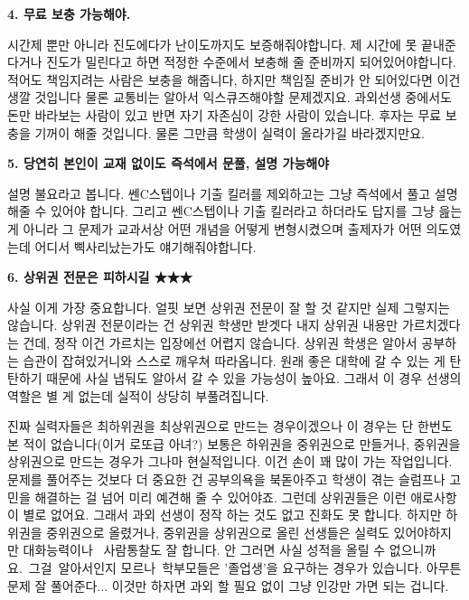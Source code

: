 \item \textbf{4. 무료 보충 가능해야.}
\vspace{5mm}

시간제 뿐만 아니라 진도에다가 난이도까지도 보증해줘야합니다.
제 시간에 못 끝내준다거나 진도가 밀린다고 하면 적정한 수준에서 보충해 줄 준비까지 되어있어야합니다.
적어도 책임지려는 사람은 보충을 해줍니다, 하지만 책임질 준비가 안 되어있다면 이건 생깔 것입니다
물론 교통비는 알아서 익스큐즈해야할 문제겠지요.
과외선생 중에서도 돈만 바라보는 사람이 있고 반면 자기 자존심이 강한 사람이 있습니다.
후자는 무료 보충을 기꺼이 해줄 것입니다. 물론 그만큼 학생이 실력이 올라가길 바라겠지만요.
\vspace{5mm}

\item \textbf{5. 당연히 본인이 교재 없이도 즉석에서 문풀, 설명 가능해야}
\vspace{5mm}

설명 불요라고 봅니다. 쎈C스텝이나 기출 킬러를 제외하고는 그냥 즉석에서 풀고 설명해줄 수 있어야 합니다.
그리고 쎈C스텝이나 기출 킬러라고 하더라도 답지를 그냥 읊는 게 아니라
그 문제가 교과서상 어떤 개념을 어떻게 변형시켰으며 출제자가 어떤 의도였는데 어디서 삑사리났는가도 얘기해줘야합니다.
\vspace{5mm}

\item \textbf{6. 상위권 전문은 피하시길 ★★★}
\vspace{5mm}

사실 이게 가장 중요합니다. 얼핏 보면 상위권 전문이 잘 할 것 같지만 실제 그렇지는 않습니다.
상위권 전문이라는 건 상위권 학생만 받겟다 내지 상위권 내용만 가르치겠다는 건데, 정작 이건 가르치는 입장에선 어렵지 않습니다.
상위권 학생은 알아서 공부하는 습관이 잡혀있거니와 스스로 깨우쳐 따라옵니다.
원래 좋은 대학에 갈 수 있는 게 탄탄하기 때문에 사실 냅둬도 알아서 갈 수 있을 가능성이 높아요.
그래서 이 경우 선생의 역할은 별 게 없는데 실적이 상당히 부풀려집니다.
\vspace{5mm}

진짜 실력자들은 최하위권을 최상위권으로 만드는 경우이겠으나 이 경우는 단 한번도 본 적이 없습니다(이거 로또급 아녀?)
보통은 하위권을 중위권으로 만들거나, 중위권을 상위권으로 만드는 경우가 그나마 현실적입니다. 이건 손이 꽤 많이 가는 작업입니다.
문제를 풀어주는 것보다 더 중요한 건 공부의욕을 북돋아주고 학생이 겪는 슬럼프나 고민을 해결하는 걸 넘어 미리 예견해 줄 수 있어야죠.
그런데 상위권들은 이런 애로사항이 별로 없어요. 그래서 과외 선생이 정작 하는 것도 없고 진화도 못 합니다.
하지만 하위권을 중위권으로 올렸거나, 중위권을 상위권으로 올린 선생들은 실력도 있어야하지만 대화능력이나  사람통찰도 잘 합니다.
안 그러면 사실 성적을 올릴 수 없으니까요. 그걸 알아서인지 모르나 학부모들은 '졸업생'을 요구하는 경우가 있습니다.
아무튼 문제 잘 풀어준다... 이것만 하자면 과외 할 필요 없이 그냥 인강만 가면 되는 겁니다.
\vspace{5mm}

